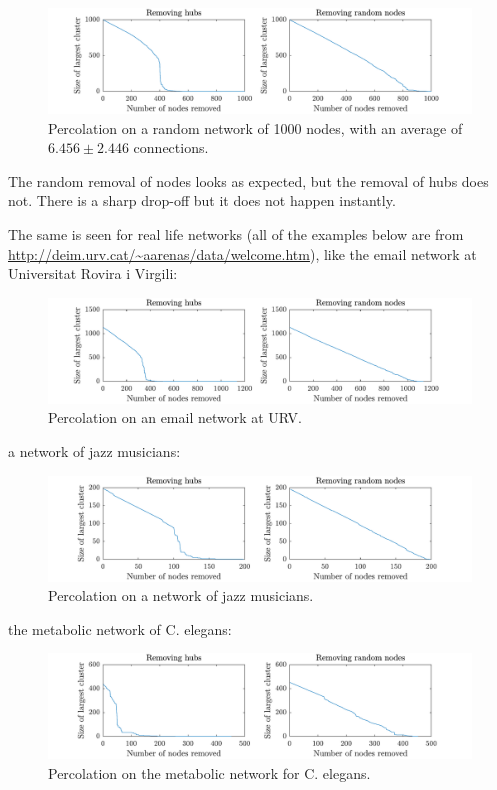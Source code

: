 \documentclass[a4paper,10pt]{article} 	%
\numberwithin{equation}{section}
\begin{document}
	\begin{figure}[H]
		\centering
		\includegraphics[width=\linewidth]{NetworkRandom}
		\caption{Percolation on a random network of 1000 nodes, with an average of $ 6.456 \pm 2.446 $ connections.}
		\label{fig:networkRand}
	\end{figure}
	The random removal of nodes looks as expected, but the removal of hubs does not. There is a sharp drop-off but it does not happen instantly.
	
	The same is seen for real life networks (all of the examples below are from \url{http://deim.urv.cat/~aarenas/data/welcome.htm}), like the email network at Universitat Rovira i Virgili:
	\begin{figure}[H]
		\centering
		\includegraphics[width=\linewidth]{NetworkEmail}
		\caption{Percolation on an email network at URV.}
		\label{fig:networkEmail}
	\end{figure}
	a network of jazz musicians:
	\begin{figure}[H]
		\centering
		\includegraphics[width=\linewidth]{NetworkJazz}
		\caption{Percolation on a network of jazz musicians.}
		\label{fig:networkJazz}
	\end{figure}
	the metabolic network of C. elegans:
	\begin{figure}[H]
		\centering
		\includegraphics[width=\linewidth]{NetworkMeta}
		\caption{Percolation on the metabolic network for C. elegans.}
		\label{fig:networkMeta}
	\end{figure}
	
\end{document}
